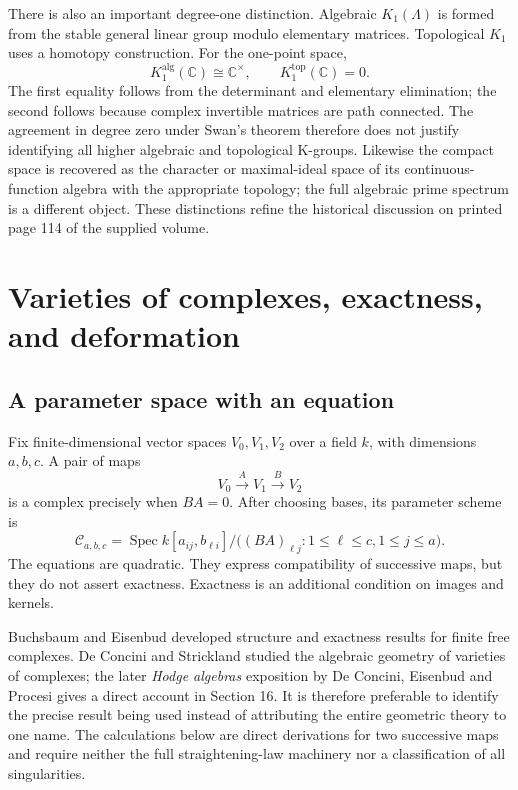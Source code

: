 There is also an important degree-one distinction. Algebraic $K_1(\Lambda)$ is formed from the stable general linear group modulo elementary matrices. Topological $K_1$ uses a homotopy construction. For the one-point space,
\[
K_1^{\mathrm{alg}}(\mathbb C)\cong\mathbb C^\times,
\qquad K_1^{\mathrm{top}}(\mathbb C)=0.
\]
The first equality follows from the determinant and elementary elimination; the second follows because complex invertible matrices are path connected. The agreement in degree zero under Swan's theorem therefore does not justify identifying all higher algebraic and topological K-groups. Likewise the compact space is recovered as the character or maximal-ideal space of its continuous-function algebra with the appropriate topology; the full algebraic prime spectrum is a different object. These distinctions refine the historical discussion on printed page 114 of the supplied volume.\cite{v2Roggenkamp1970II,v2Swan1962}

\chapter{Varieties of complexes, exactness, and deformation}
\label{ch:varieties-complexes}

\section{A parameter space with an equation}

Fix finite-dimensional vector spaces $V_0,V_1,V_2$ over a field $k$, with dimensions $a,b,c$. A pair of maps
\[
V_0\xrightarrow{A}V_1\xrightarrow{B}V_2
\]
is a complex precisely when $BA=0$. After choosing bases, its parameter scheme is
\[
\mathcal C_{a,b,c}
=\operatorname{Spec}
 k[a_{ij},b_{\ell i}]/\bigl((BA)_{\ell j}:1\leq\ell\leq c,
                                      1\leq j\leq a\bigr).
\]
The equations are quadratic. They express compatibility of successive maps, but they do not assert exactness. Exactness is an additional condition on images and kernels.

Buchsbaum and Eisenbud developed structure and exactness results for finite free complexes. De Concini and Strickland studied the algebraic geometry of varieties of complexes; the later \emph{Hodge algebras} exposition by De Concini, Eisenbud and Procesi gives a direct account in Section 16. It is therefore preferable to identify the precise result being used instead of attributing the entire geometric theory to one name. The calculations below are direct derivations for two successive maps and require neither the full straightening-law machinery nor a classification of all singularities.\cite{v2BE1973,v2DS1981,v2DEP1982}

